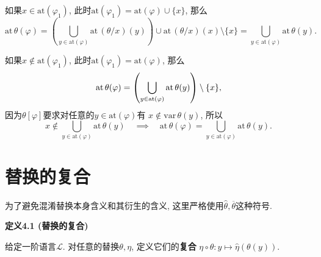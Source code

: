 \documentclass[UTF8]{ctexart}
\begin{document}
\begin{enumerate}
    \hspace{2.17em}
    如果$x\in\mathrm{at}(\varphi_1)$,
    此时$\mathrm{at}(\varphi_1)=\mathrm{at}(\varphi)\cup\{x\}$, 那么
    \vspace{3pt}
    \[
        \mathrm{at}\,\theta(\varphi)=
        \left(\bigcup_{y\in\mathrm{at}(\varphi)}\mathrm{at}\,(\theta/x)(y)\right)
        \cup\mathrm{at}\,(\theta/x)(x)\setminus\{x\}=
        \bigcup_{y\in\mathrm{at}(\varphi)}\mathrm{at}\,\theta(y).
    \]

    \hspace{2.17em}
    如果$x\notin\mathrm{at}(\varphi_1)$,
    此时$\mathrm{at}(\varphi_1)=\mathrm{at}(\varphi)$, 那么
    \[
        \mathrm{at}\,\theta(\varphi)=
        \left(\bigcup_{y\in\mathrm{at}(\varphi)}\mathrm{at}\,\theta(y)\right)
        \setminus\{x\},\\[3pt]
    \]
    因为$\theta[\varphi]$要求对任意的$y\in\mathrm{at}(\varphi)$有
    $x\notin\mathrm{var}\,\theta(y)$, 所以
    \begin{equation*}
        x\notin\bigcup_{y\in\mathrm{at}(\varphi)}\mathrm{at}\,\theta(y)\quad
        \implies\quad\mathrm{at}\,\theta(\varphi)=
        \bigcup_{y\in\mathrm{at}(\varphi)}\mathrm{at}\,\theta(y).
    \tag*{\qedsymbol}\end{equation*}
\end{enumerate}





\newpage



\section{替换的复合}

为了避免混淆替换本身含义和其衍生的含义,
这里严格使用$\widehat{\theta},\overline{\theta}$这种符号.

\vspace{10pt}

\hypertarget{sec:定义4.1}{}
\noindent\textbf{定义4.1 (替换的复合)}

给定一阶语言$\mathcal{L}$. 对任意的替换$\theta,\eta$, 定义它们的\textbf{复合}
$\eta\circ\theta:y\mapsto \widehat{\eta}(\theta(y))$.

\vspace{10pt}
\end{document}
